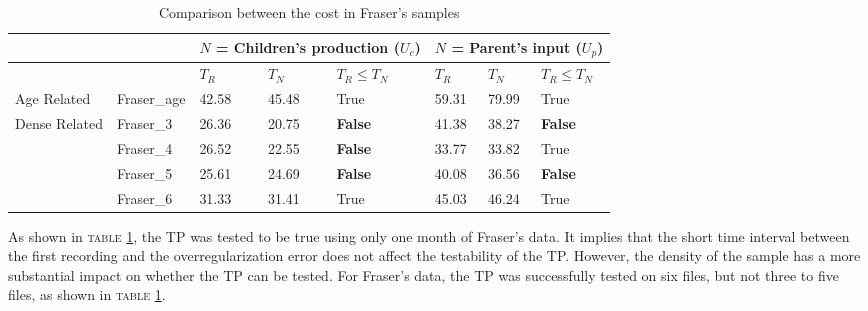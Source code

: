 \begin{table}[!ht]
\centering
\caption{Comparison between the cost in Fraser's samples}
\label{table:Fraser<}
\begin{tabular}{lllll|lll}
\toprule
& & \multicolumn{3}{l}{$N$ = Children's production ($U_c$)} & \multicolumn{3}{l}{$N$ = Parent's input ($U_p$)} \\
\hline
& & $T_R$ & $T_N$ & $T_R \leq T_N$ & $T_R$ & $T_N$ & $T_R \leq T_N$ \\
 \hline
Age Related & Fraser_{age} & 42.58 & 45.48 &True & 59.31& 79.99 & True\\
\hline
Dense Related & Fraser_3 & 26.36 & 20.75 & \textbf{False} & 41.38 & 38.27 & \textbf{False}\\
&Fraser_4 & 26.52 & 22.55 & \textbf{False} & 33.77 & 33.82 & True\\
&Fraser_5 & 25.61 & 24.69 & \textbf{False} & 40.08 & 36.56 & \textbf{False}\\
&Fraser_6 & 31.33 & 31.41 & True & 45.03 & 46.24 & True\\
\bottomrule
\end{tabular}
\end{table}

As shown in \textsc{table} \ref{table:Fraser<}, the TP was tested to be true using only one month of Fraser's data. It implies that the short time interval between the first recording and the overregularization error does not affect the testability of the TP. However, the density of the sample has a more substantial impact on whether the TP can be tested. For Fraser's data, the TP was successfully tested on six files, but not three to five files, as shown in \textsc{table} \ref{table:Fraser<}. 